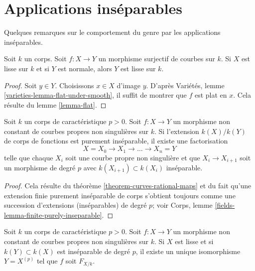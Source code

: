 \section{Applications inséparables}
\label{section-inseparable}

\noindent
Quelques remarques sur le comportement du genre par les applications inséparables.

\begin{lemma}
\label{lemma-dominated-by-smooth}
Soit $k$ un corps. Soit $f : X \to Y$ un morphisme surjectif de courbes sur $k$. Si $X$ est lisse sur $k$ et si $Y$ est normale, alors $Y$ est lisse sur $k$.
\end{lemma}

\begin{proof}
Soit $y \in Y$. Choisissons $x \in X$ d'image $y$. D'après Variétés, lemme \ref{varieties-lemma-flat-under-smooth}, il suffit de montrer que $f$ est plat en $x$. Cela résulte du lemme \ref{lemma-flat}.
\end{proof}

\begin{lemma}
\label{lemma-purely-inseparable}
Soit $k$ un corps de caractéristique $p > 0$. Soit $f : X \to Y$ un morphisme non constant de courbes propres non singulières sur $k$. Si l'extension $k(X)/k(Y)$ de corps de fonctions est purement inséparable, il existe une factorisation $$
X = X_0 \to X_1 \to \ldots \to X_n = Y
$$ telle que chaque $X_i$ soit une courbe propre non singulière et que $X_i \to X_{i + 1}$ soit un morphisme de degré $p$ avec $k(X_{i + 1}) \subset k(X_i)$ inséparable.
\end{lemma}

\begin{proof}
Cela résulte du théorème \ref{theorem-curves-rational-maps} et du fait qu'une extension finie purement inséparable de corps s'obtient toujours comme une succession d'extensions (inséparables) de degré $p$; voir Corps, lemme \ref{fields-lemma-finite-purely-inseparable}.
\end{proof}

\begin{lemma}
\label{lemma-inseparable-deg-p-smooth}
Soit $k$ un corps de caractéristique $p > 0$. Soit $f : X \to Y$ un morphisme non constant de courbes propres non singulières sur $k$. Si $X$ est lisse et si $k(Y) \subset k(X)$ est inséparable de degré $p$, il existe un unique isomorphisme $Y = X^{(p)}$ tel que $f$ soit $F_{X/k}$.
\end{lemma}

